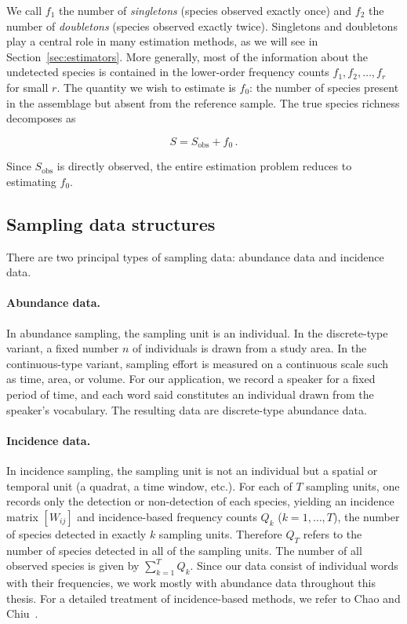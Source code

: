 \documentclass{article}
\begin{document}
We call $f_1$ the number of \emph{singletons} (species observed exactly once) and $f_2$ the number of \emph{doubletons} (species observed exactly twice). Singletons and doubletons play a central role in many estimation methods, as we will see in Section~\ref{sec:estimators}. More generally, most of the information about the undetected species is contained in the lower-order frequency counts $f_1, f_2, \ldots, f_r$ for small $r$. The quantity we wish to estimate is $f_0$: the number of species present in the assemblage but absent from the reference sample. The true species richness decomposes as

\begin{equation}\label{eq:fundamental}
    S = S_{\mathrm{obs}} + f_0\,.
\end{equation}

Since $S_{\mathrm{obs}}$ is directly observed, the entire estimation 
problem reduces to estimating $f_0$.\\

\subsection{Sampling data structures}
 
There are two principal types of sampling data: abundance data and incidence data.

\paragraph{Abundance data.}
In abundance sampling, the sampling unit is an individual. In the discrete-type variant, a fixed number $n$ of individuals is drawn from a study area. In the continuous-type variant, sampling effort is measured on a continuous scale such as time, area, or volume. For our application, we record a speaker for a fixed period of time, and each word said constitutes an individual drawn from the speaker's vocabulary. The resulting data are discrete-type abundance data.


\paragraph{Incidence data.}
In incidence sampling, the sampling unit is not an individual but a spatial or temporal unit (a quadrat, a time window, etc.). For each of $T$ sampling units, one records only the detection or non-detection of each species, yielding an incidence matrix $[W_{ij}]$ and incidence-based frequency counts $Q_k$ ($k = 1, \ldots, T$), the number of species detected in exactly $k$ sampling units. Therefore $Q_T$ refers to the number of species detected in all of the sampling units. The number of all observed species is given by $\sum_{k=1}^T Q_k$. Since our data consist of individual words with their frequencies, we work mostly with abundance data throughout this thesis. For a detailed treatment of incidence-based methods, we refer to Chao and Chiu~\cite{chao2016species}.\\
\end{document}
